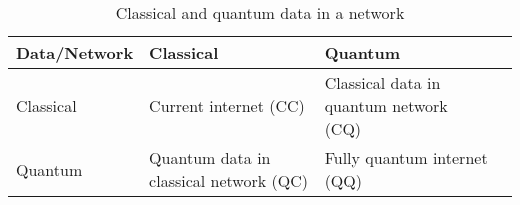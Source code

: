 \documentclass[twocolumn, aps, rmp, amsmath, amssymb, nofootinbib, superscriptaddress, longbibliography, floatfix, table-of-contents, eqsecnum]{revtex4-2}
\begin{document}






\clearpage
\begin{table}[h]
\centering
\begin{adjustbox}{width=\textwidth}
\begin{tabular}{llll}
Data/Network & Classical & Quantum \\\hline
Classical & Current internet (CC) & Classical data in quantum network (CQ) \\
Quantum & Quantum data in classical network (QC) & Fully quantum internet (QQ)
\end{tabular}
\end{adjustbox}
\caption{\label{tab:CommTable} Classical and quantum data in a network}
\end{table}
\clearpage 
\end{document}
